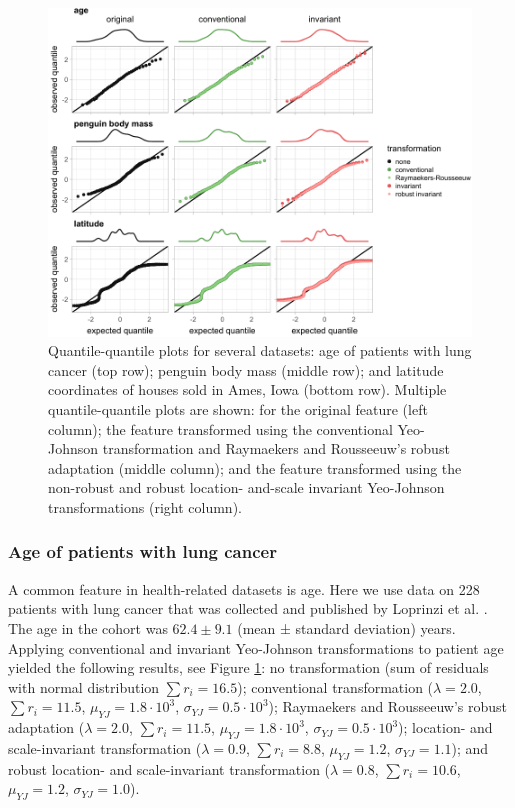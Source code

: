 \documentclass[preprint,12pt,authoryear]{elsarticle}
\begin{document}
\begin{figure}

{\centering \includegraphics[width=1\linewidth]{figure_8} 

}

\caption{Quantile-quantile plots for several datasets: age of patients with lung cancer (top row); penguin body mass (middle row); and latitude coordinates of houses sold in Ames, Iowa (bottom row). Multiple quantile-quantile plots are shown: for the original feature (left column); the feature transformed using the conventional Yeo-Johnson transformation and Raymaekers and Rousseeuw's robust adaptation (middle column); and the feature transformed using the non-robust and robust location- and-scale invariant Yeo-Johnson transformations (right column).}\label{fig:experimental-results-invariance}
\end{figure}

\subsubsection{Age of patients with lung
cancer}\label{sec:age-of-patients-with-lung-cancer}

A common feature in health-related datasets is age. Here we use data on
228 patients with lung cancer that was collected and published by
Loprinzi et al. \citep{Loprinzi1994-cd}. The age in the cohort was
\(62.4 \pm 9.1\) (mean ± standard deviation) years. Applying
conventional and invariant Yeo-Johnson transformations to patient age
yielded the following results, see Figure
\ref{fig:experimental-results-invariance}: no transformation (sum of
residuals with normal distribution \(\sum r_i = 16.5\)); conventional
transformation (\(\lambda = 2.0\), \(\sum r_i = 11.5\),
\(\mu_{YJ} = 1.8 \cdot 10^3\), \(\sigma_{YJ} = 0.5 \cdot 10^3\));
Raymaekers and Rousseeuw's robust adaptation (\(\lambda = 2.0\),
\(\sum r_i = 11.5\), \(\mu_{YJ} = 1.8 \cdot 10^3\),
\(\sigma_{YJ} = 0.5 \cdot 10^3\)); location- and scale-invariant
transformation (\(\lambda = 0.9\), \(\sum r_i = 8.8\),
\(\mu_{YJ} = 1.2\), \(\sigma_{YJ} = 1.1\)); and robust location- and
scale-invariant transformation (\(\lambda = 0.8\), \(\sum r_i = 10.6\),
\(\mu_{YJ} = 1.2\), \(\sigma_{YJ} = 1.0\)).
\end{document}
